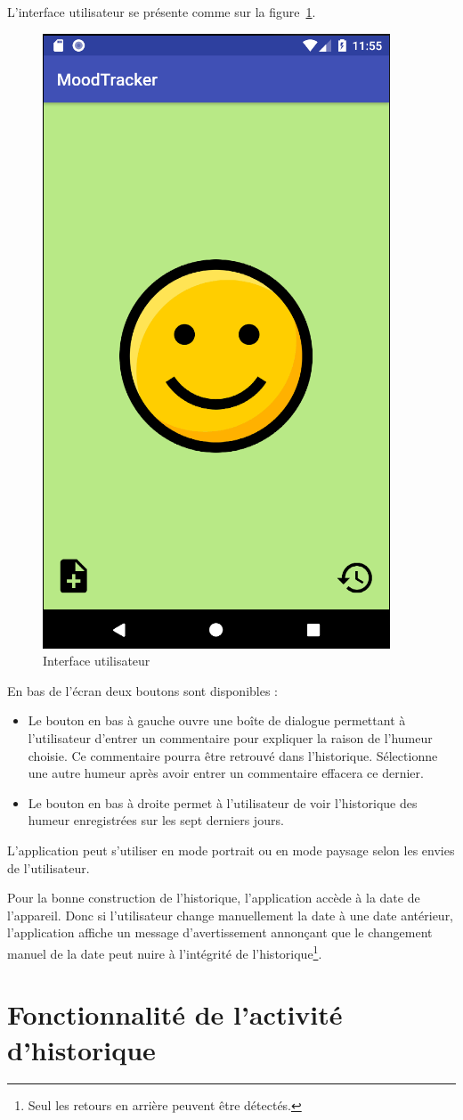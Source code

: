 \documentclass{article}[a4paper,12pt]
\begin{document}
L'interface utilisateur se présente comme sur la figure~\ref{interface}.
\begin{figure}
  \centering
  \includegraphics[width=.4\textwidth]{interface.png}
  \caption{Interface utilisateur}
  \label{interface}
\end{figure}
En bas de l'écran deux boutons sont disponibles :
\begin{itemize}
\item Le bouton en bas à gauche ouvre une boîte de dialogue permettant à l'utilisateur d'entrer un commentaire pour expliquer la raison de l'humeur choisie. Ce commentaire pourra être retrouvé dans l'historique. Sélectionne une autre humeur après avoir entrer un commentaire effacera ce dernier. 
\item Le bouton en bas à droite permet à l'utilisateur de voir l'historique des humeur enregistrées sur les sept derniers jours.
\end{itemize}

L'application peut s'utiliser en mode portrait ou en mode paysage selon les envies de l'utilisateur.

Pour la bonne construction de l'historique, l'application accède à la date de l'appareil. Donc si l'utilisateur change manuellement la date à une date antérieur, l'application affiche un message d'avertissement annonçant que le changement manuel de la date peut nuire à l'intégrité de l'historique\footnote{Seul les retours en arrière peuvent être détectés.}.

\section{Fonctionnalité de l'activité d'historique}
\end{document}

